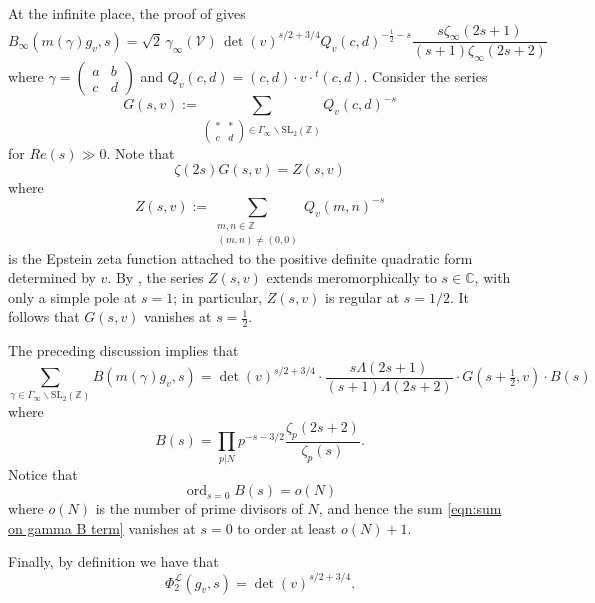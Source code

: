 \documentclass[reqno,oneside]{amsart}
\theoremstyle{plain}
\theoremstyle{remark}
\numberwithin{theorem}{section}
\newcommand{\bbC}{\mathbb C}
\newcommand{\bbZ}{\mathbb Z}
\newcommand{\calL}{\mathcal L}
\newcommand{\calV}{\mathcal V}
\newcommand{\psm}[1]{\left( \begin{smallmatrix}#1 \end{smallmatrix} \right)}
\begin{document}
	At the infinite place, the proof of \cite[Proposition 5.9.2]{KRYbook} gives
	\begin{equation}
	B_{\infty}(m(\gamma) g_v, s) = \sqrt{2} \, \gamma_{\infty}(\calV) \, \det(v)^{s/2 + 3/4} Q_v(c,d)^{-\frac12 - s} \frac{s\zeta_{\infty}(2s+1)}{(s+1) \zeta_{\infty}(2s+2)}
	\end{equation}
	where $\gamma = \psm{a & b \\ c& d}$ and $Q_v(c,d)  = (c,d) \cdot v \cdot {}^t(c,d)$. Consider the series
	\begin{equation}
	G(s, v) := \sum_{\psm{* & *\\ c& d} \in \Gamma_{\infty} \backslash \mathrm{SL}_2(\bbZ)} Q_v(c,d)^{-s}
	\end{equation}
	for $Re(s) \gg 0$. Note that
	\begin{equation}
	\zeta(2s)	G(s,v) =  Z(s,v)
	\end{equation}
	where
	\begin{equation}
	Z(s,v) := \sum_{\substack{m,n \in \mathbb Z \\ (m,n) \neq (0,0)} }  Q_v(m,n)^{-s}
	\end{equation}
	is the Epstein zeta function attached to the positive definite quadratic form determined by $v$.
	By \cite[\S 1.5]{Siegel}, the series $Z(s,v)$ extends meromorphically  to $s \in \bbC$, with only a  simple pole at $s=1$; in particular, $Z(s, v)$ is regular at $s=1/2$. It follows that $G(s,v)$ vanishes at $s=\frac12$.
	
	The preceding discussion implies that
	\begin{equation} \label{eqn:sum on gamma B term}
	\sum_{\gamma \in \Gamma_{\infty} \backslash \mathrm{SL}_2(\bbZ)} B(m(\gamma) g_v, s) = \det(v)^{s/2 + 3/4} \cdot \frac{s \Lambda(2s+1)}{(s+1)\Lambda(2s+2)} \cdot G(s+\tfrac12, v) \cdot B(s)
	\end{equation}
	where
	\begin{equation}
	B(s) = \prod_{p|N} p^{-s-3/2} \frac{\zeta_p(2s+2)}{\zeta_p(s)}.
	\end{equation}
	Notice that
	\begin{equation}
	\mathop{ord}_{s=0}B(s) = o(N)
	\end{equation}
	where $o(N)$ is the number of prime divisors of $N$, and hence the sum \eqref{eqn:sum on gamma B term} vanishes at $s=0$ to order at least $o(N)+1$.
	
	Finally, by definition we have that
	\begin{equation}
	\Phi_2^{\calL}(g_v, s) = \det(v)^{s/2+3/4}.
	\end{equation}
	
\end{document}
